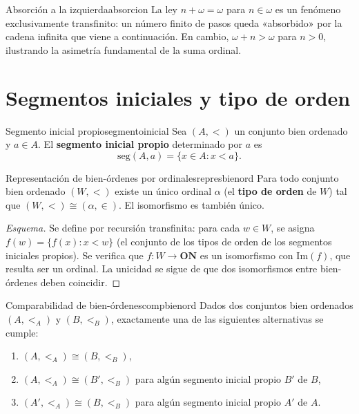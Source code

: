 \begin{observacion}{Absorción a la izquierda}{absorcion}
La ley $n + \omega = \omega$ para $n \in \omega$ es un fenómeno exclusivamente transfinito: un número finito de pasos queda «absorbido» por la cadena infinita que viene a continuación. En cambio, $\omega + n > \omega$ para $n > 0$, ilustrando la asimetría fundamental de la suma ordinal.
\end{observacion}

\section{Segmentos iniciales y tipo de orden}

\begin{definicion}{Segmento inicial propio}{segmentoinicial}
Sea $(A, <)$ un conjunto bien ordenado y $a \in A$. El \textbf{segmento inicial propio} determinado por $a$ es
\[
  \text{seg}(A, a) = \{x \in A : x < a\}.
\]
\end{definicion}

\begin{teorema}{Representación de bien-órdenes por ordinales}{represbienord}
Para todo conjunto bien ordenado $(W, <)$ existe un único ordinal $\alpha$ (el \textbf{tipo de orden} de $W$) tal que $(W, <) \cong (\alpha, \in)$. El isomorfismo es también único.
\end{teorema}

\begin{proof}[Esquema]
Se define por recursión transfinita: para cada $w \in W$, se asigna $f(w) = \{f(x) : x < w\}$ (el conjunto de los tipos de orden de los segmentos iniciales propios). Se verifica que $f: W \to \mathbf{ON}$ es un isomorfismo con $\text{Im}(f)$, que resulta ser un ordinal. La unicidad se sigue de que dos isomorfismos entre bien-órdenes deben coincidir.
\end{proof}

\begin{corolario}{Comparabilidad de bien-órdenes}{compbienord}
Dados dos conjuntos bien ordenados $(A, <_A)$ y $(B, <_B)$, exactamente una de las siguientes alternativas se cumple:
\begin{enumerate}[leftmargin=2em, label=(\roman*)]
  \item $(A, <_A) \cong (B, <_B)$,
  \item $(A, <_A) \cong (B', <_B)$ para algún segmento inicial propio $B'$ de $B$,
  \item $(A', <_A) \cong (B, <_B)$ para algún segmento inicial propio $A'$ de $A$.
\end{enumerate}
\end{corolario}

